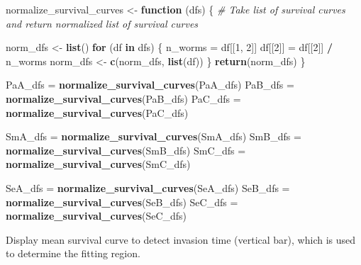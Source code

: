 \documentclass[]{article}
\newenvironment{Shaded}{\begin{snugshade}}{\end{snugshade}}
\newcommand{\KeywordTok}[1]{\textcolor[rgb]{0.13,0.29,0.53}{\textbf{#1}}}
\newcommand{\DecValTok}[1]{\textcolor[rgb]{0.00,0.00,0.81}{#1}}
\newcommand{\StringTok}[1]{\textcolor[rgb]{0.31,0.60,0.02}{#1}}
\newcommand{\CommentTok}[1]{\textcolor[rgb]{0.56,0.35,0.01}{\textit{#1}}}
\newcommand{\ControlFlowTok}[1]{\textcolor[rgb]{0.13,0.29,0.53}{\textbf{#1}}}
\newcommand{\OperatorTok}[1]{\textcolor[rgb]{0.81,0.36,0.00}{\textbf{#1}}}
\newcommand{\NormalTok}[1]{#1}
\begin{document}
\begin{Shaded}
\begin{Highlighting}[]
\NormalTok{normalize_survival_curves <-}\StringTok{ }\ControlFlowTok{function}\NormalTok{ (dfs) \{}
  \CommentTok{# Take list of survival curves and return normalized list of survival curves}
  
\NormalTok{  norm_dfs <-}\StringTok{ }\KeywordTok{list}\NormalTok{()}
  \ControlFlowTok{for}\NormalTok{ (df }\ControlFlowTok{in}\NormalTok{ dfs) \{}
\NormalTok{    n_worms =}\StringTok{ }\NormalTok{df[[}\DecValTok{1}\NormalTok{, }\DecValTok{2}\NormalTok{]]}
\NormalTok{    df[[}\DecValTok{2}\NormalTok{]] =}\StringTok{ }\NormalTok{df[[}\DecValTok{2}\NormalTok{]] }\OperatorTok{/}\StringTok{ }\NormalTok{n_worms}
\NormalTok{    norm_dfs <-}\StringTok{ }\KeywordTok{c}\NormalTok{(norm_dfs, }\KeywordTok{list}\NormalTok{(df))}
\NormalTok{  \}  }
  \KeywordTok{return}\NormalTok{(norm_dfs)}
\NormalTok{\}}

\NormalTok{PaA_dfs =}\StringTok{ }\KeywordTok{normalize_survival_curves}\NormalTok{(PaA_dfs)}
\NormalTok{PaB_dfs =}\StringTok{ }\KeywordTok{normalize_survival_curves}\NormalTok{(PaB_dfs)}
\NormalTok{PaC_dfs =}\StringTok{ }\KeywordTok{normalize_survival_curves}\NormalTok{(PaC_dfs)}

\NormalTok{SmA_dfs =}\StringTok{ }\KeywordTok{normalize_survival_curves}\NormalTok{(SmA_dfs)}
\NormalTok{SmB_dfs =}\StringTok{ }\KeywordTok{normalize_survival_curves}\NormalTok{(SmB_dfs)}
\NormalTok{SmC_dfs =}\StringTok{ }\KeywordTok{normalize_survival_curves}\NormalTok{(SmC_dfs)}

\NormalTok{SeA_dfs =}\StringTok{ }\KeywordTok{normalize_survival_curves}\NormalTok{(SeA_dfs)}
\NormalTok{SeB_dfs =}\StringTok{ }\KeywordTok{normalize_survival_curves}\NormalTok{(SeB_dfs)}
\NormalTok{SeC_dfs =}\StringTok{ }\KeywordTok{normalize_survival_curves}\NormalTok{(SeC_dfs)}
\end{Highlighting}
\end{Shaded}

Display mean survival curve to detect invasion time (vertical bar),
which is used to determine the fitting region.
\end{document}
